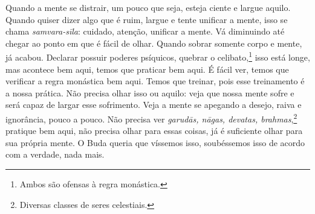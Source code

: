 Quando a mente se distrair, um pouco que seja, esteja ciente e
largue aquilo. Quando quiser dizer algo que é ruim, largue e tente
unificar a mente, isso se chama \textit{samvara-sīla}:\textit{
}cuidado, atenção, unificar a mente. Vá diminuindo até chegar ao ponto
em que é fácil de olhar. Quando sobrar somente corpo e mente, já
acabou. Declarar possuir poderes psíquicos, quebrar o
celibato,\footnote{Ambos são ofensas à regra monástica.} isso está
longe, mas acontece bem aqui, temos que praticar bem aqui. É fácil ver,
temos que verificar a regra monástica bem aqui. Temos que treinar, pois
esse treinamento é a nossa prática. Não precisa olhar isso ou aquilo:
veja que nossa mente sofre e será capaz de largar esse sofrimento. Veja
a mente se apegando a desejo, raiva e ignorância, pouco a pouco. Não
precisa ver \textit{garudās, nāgas, devatas,
brahmas},\footnote{Diversas classes de seres celestiais.} pratique bem
aqui, não precisa olhar para essas coisas, já é suficiente olhar para
sua própria mente. O Buda queria que víssemos isso, soubéssemos isso de
acordo com a verdade, nada mais.
